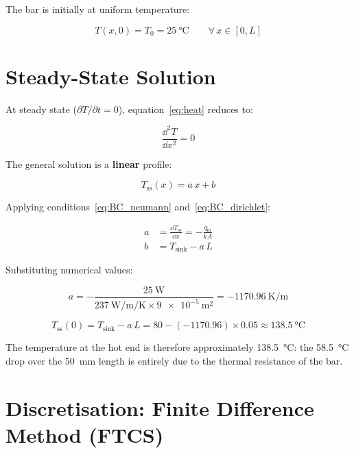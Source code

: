 \documentclass[11pt, a4paper]{scrartcl}
\begin{document}
\begin{onehalfspace}
The bar is initially at uniform temperature:

\begin{equation}
  T(x, 0) = T_0 = \SI{25}{\celsius} \qquad \forall\, x \in [0, L]
  \label{eq:IC}
\end{equation}

\section{Steady-State Solution}

At steady state ($\partial T / \partial t = 0$), equation~\eqref{eq:heat} reduces to:

\begin{equation}
  \frac{\dd^2 T}{\dd x^2} = 0
  \label{eq:laplace1D}
\end{equation}

The general solution is a \textbf{linear} profile:

\begin{equation}
  T_\text{ss}(x) = a\, x + b
  \label{eq:lin}
\end{equation}

Applying conditions~\eqref{eq:BC_neumann} and~\eqref{eq:BC_dirichlet}:

\begin{align}
  a &= \frac{\dd T_\text{ss}}{\dd x} = -\frac{q_\text{in}}{k A} \label{eq:a}\\[6pt]
  b &= T_\text{sink} - a\, L \label{eq:b}
\end{align}

Substituting numerical values:

\begin{equation}
  a = -\frac{\SI{25}{\watt}}{\SI{237}{\watt\per\meter\per\kelvin} \times \SI{9e-5}{\meter\squared}}
    = \SI{-1170.96}{\kelvin\per\meter}
\end{equation}

\begin{equation}
  T_\text{ss}(0) = T_\text{sink} - a\,L = 80 - (-1170.96) \times 0.05 \approx \SI{138.5}{\celsius}
\end{equation}

The temperature at the hot end is therefore approximately \SI{138.5}{\celsius}: the \SI{58.5}{\celsius} drop over the \SI{50}{\milli\meter} length is entirely due to the thermal resistance of the bar.

\section{Discretisation: Finite Difference Method (FTCS)}


\end{onehalfspace}
\end{document}
